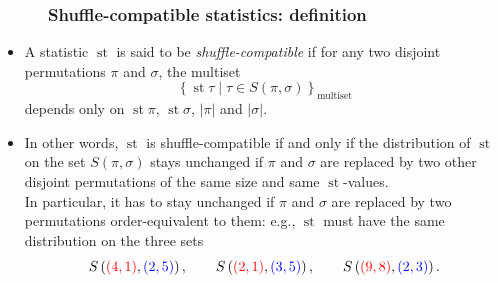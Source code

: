\documentclass{beamer}
\newcommand{\red}{\color{red}}
\newcommand{\blue}{\color{blue}}
\newcommand{\st}{\operatorname{st}}
\newcommand{\fti}[1]{\frametitle{\ \ \ \ \ #1}}
\newcommand{\set}[1]{\left\{ #1 \right\}}
\newcommand{\abs}[1]{\left| #1 \right|}
\newcommand{\tup}[1]{\left( #1 \right)}
\newcommand{\defn}[1]{{\color{darkred}\emph{#1}}} %
\theoremstyle{plain}
\begin{document}
\begin{frame}
\fti{Shuffle-compatible statistics: definition}

\begin{itemize}

\item A statistic $\st$ is said to be \defn{shuffle-compatible}
      if for any two disjoint permutations $\pi$ and $\sigma$, the
      multiset
      \[
      \set{ \st\tau \mid \tau\in S\tup{\pi, \sigma} }_{\text{multiset}}
      \]
      depends only on $\st \pi$, $\st \sigma$, $\abs{\pi}$ and
      $\abs{\sigma}$.

\pause

\item In other words, $\st$ is shuffle-compatible if and only if
      the distribution of
      $\st$ on the set $S \tup{ \pi , \sigma }$
      stays unchanged if $\pi$ and $\sigma$ are replaced by two
      other disjoint permutations of the same size and same $\st$-values.
      \pause \\
      In particular, it has to stay unchanged if $\pi$ and $\sigma$
      are replaced by two permutations order-equivalent to them:
      e.g., $\st$ must have the same distribution
      on the three sets
      \[
      S \tup{ {\red \tup{4, 1}} , {\blue \tup{2, 5}} },
      \qquad S \tup{ {\red \tup{2, 1}} , {\blue \tup{3, 5}} } ,
      \qquad S \tup{ {\red \tup{9, 8}} , {\blue \tup{2, 3}} } .
      \]

\end{itemize}

\end{frame}
\end{document}
